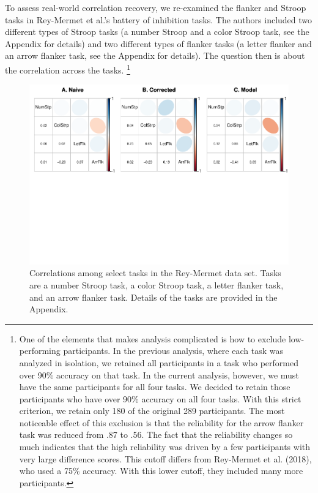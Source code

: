 \documentclass[
  ,man]{apa6}
\begin{document}
To assess real-world correlation recovery, we re-examined the flanker and Stroop tasks in Rey-Mermet et al.'s battery of inhibition tasks. The authors included two different types of Stroop tasks (a number Stroop and a color Stroop task, see the Appendix for details) and two different types of flanker tasks (a letter flanker and an arrow flanker task, see the Appendix for details). The question then is about the correlation across the tasks. \footnote{One of the elements that makes analysis complicated is how to exclude low-performing participants. In the previous analysis, where each task was analyzed in isolation, we retained all participants in a task who performed over 90\% accuracy on that task. In the current analysis, however, we must have the same participants for all four tasks. We decided to retain those participants who have over 90\% accuracy on all four tasks. With this strict criterion, we retain only 180 of the original 289 participants. The most noticeable effect of this exclusion is that the reliability for the arrow flanker task was reduced from .87 to .56. The fact that the reliability changes so much indicates that the high reliability was driven by a few participants with very large difference scores. This cutoff differs from Rey-Mermet et al. (2018), who used a 75\% accuracy. With this lower cutoff, they included many more participants.}

\begin{figure}
\centering
\includegraphics{p_files/figure-latex/rm4task-1.pdf}
\caption{\label{fig:rm4task}Correlations among select tasks in the Rey-Mermet data set. Tasks are a number Stroop task, a color Stroop task, a letter flanker task, and an arrow flanker task. Details of the tasks are provided in the Appendix.}
\end{figure}
\end{document}
